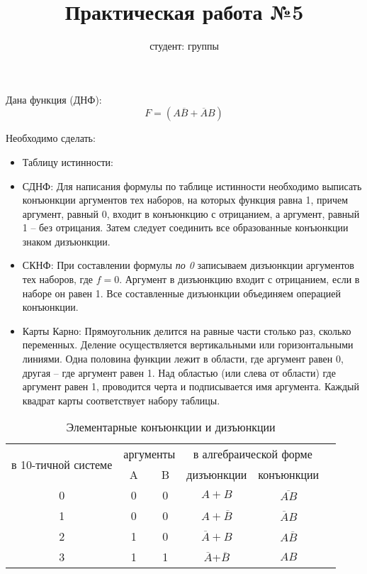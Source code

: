 \documentclass{article}
\title{Практическая работа №5}
\author{студент:    группы    }
\begin{document}
\maketitle
Дана функция (ДНФ):
$$
F=(A\overline{B} + \overline{A}B)
$$

Необходимо сделать: 
\begin{itemize}
\item Таблицу истинности:
\item СДНФ: Для написания формулы по таблице истинности необходимо выписать конъюнкции
аргументов тех наборов, на которых функция равна 1, причем аргумент, равный 0, входит 
в конъюнкцию с отрицанием, а аргумент, равный 1 -- без отрицания. Затем следует
соединить все образованные конъюнкции знаком дизъюнкции.
\item СКНФ: При составлении формулы {\it по 0} записываем дизъюнкции аргументов тех наборов,
где $f=0$. Аргумент в дизъюнкцию входит с отрицанием, если в наборе он равен 1. Все составленные
дизъюнкции объединяем операцией конъюнкции.
\item Карты Карно: Прямоугольник делится на равные части столько раз, сколько переменных. 
Деление осуществляется вертикальными или горизонтальными линиями. Одна половина функции лежит
в области, где аргумент равен 0, другая -- где аргумент равен 1. Над областью (или слева от области)
где аргумент равен 1, проводится черта и подписывается имя аргумента. Каждый квадрат карты
соответствует набору таблицы.
\end{itemize}


\begin{table}[ht]
  \centering%
\begin{tabular}{@{} cccccc @{}}
\toprule
\multirow{2}{*}{в 10-тичной системе}
&\multicolumn{2}{|c|}{аргументы}& 
\multicolumn{2}{|c|}{в алгебраической форме}\\
\cmidrule{2-5}&
\multicolumn{1}{|c|}{A}&
\multicolumn{1}{|c|}{B}& 
\multicolumn{1}{|c|}{дизъюнкции}&
\multicolumn{1}{|c|}{конъюнкции}\\
\midrule 
0 & 0 & 0 &  $A+B$ & $\overline{AB}$ \\
1 & 0 & 0 &  $A+\overline{B}$ & $\overline{A}B$\\
2 & 1 & 0 &  $\overline{A}+B$ & $A\overline{B}$\\
3 & 1 & 1 & $\overline{A}$+$\overline{B}$ & $AB$ \\ 
\bottomrule
\end{tabular}
\caption{Элементарные конъюнкции и дизъюнкции}\label{tab:table_init}
\end{table} 
\end{document}
